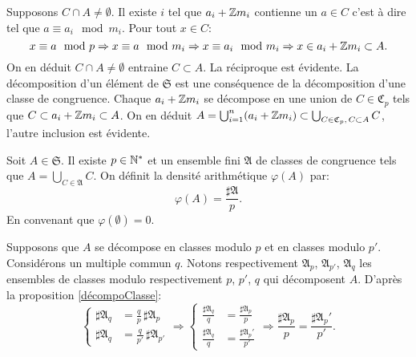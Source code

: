  \begin{demo}
  Supposons $C\cap A \neq \emptyset$. Il existe $i$ tel que $a_i + \mathbb{Z} m_i$ contienne un $a \in C$ c'est à dire tel que $a \equiv a_i \mod m_i$. Pour tout $x \in C$:
  \begin{displaymath}
   x \equiv a \mod p \Rightarrow x \equiv a \mod m_i \Rightarrow x \equiv a_i \mod m_i \Rightarrow x \in a_i + \mathbb{Z} m_i \subset A.
  \end{displaymath}
  On en déduit $C \cap A \neq \emptyset$ entraine $C \subset A$. La réciproque est évidente.\newline
  La décomposition d'un élément de $\mathfrak{S}$ est une conséquence de la décomposition d'une classe de congruence. Chaque $a_i + \mathbb{Z} m_i$ se décompose en une union de $C\in \mathfrak{C}_p$ tels que $C \subset a_i + \mathbb{Z} m_i \subset A$. On en déduit $A = \bigcup_{i=1}^n(a_i + \mathbb{Z} m_i) \subset \bigcup_{C \in \mathfrak{C}_p,\, C\subset A} C$, l'autre inclusion est évidente.
 \end{demo}

\begin{defi}
 Soit $A \in \mathfrak{S}$. Il existe $p \in \mathbb{N}^*$ et un ensemble fini $\mathfrak{A}$ de classes de congruence tels que $A = \bigcup_{C \in \mathfrak{A}}C$. On définit la densité arithmétique $\varphi(A)$ par:
 \begin{displaymath}
  \varphi(A) = \frac{\sharp \mathfrak{A}}{p}.
 \end{displaymath}
 En convenant que $\varphi(\emptyset) = 0$.
\end{defi}
\begin{demo}
Supposons que $A$ se décompose en classes modulo $p$ et en classes modulo $p'$. Considérons un multiple commun $q$. Notons respectivement $\mathfrak{A}_p$, $\mathfrak{A}_{p'}$, $\mathfrak{A}_q$ les ensembles de classes modulo respectivement $p$, $p'$, $q$ qui décomposent $A$. D'après la proposition \ref{décompoClasse}:
\begin{displaymath}
\left\lbrace
  \begin{aligned}
     \sharp \mathfrak{A}_q &= \frac{q}{p}  \, \sharp \mathfrak{A}_p \\
     \sharp \mathfrak{A}_q &= \frac{q}{p'} \, \sharp \mathfrak{A}_{p'}
  \end{aligned}
\right. \Rightarrow
\left\lbrace
 \begin{aligned}
    \frac{\sharp \mathfrak{A}_q}{q} &= \frac{\sharp \mathfrak{A}_p}{p} \\
    \frac{\sharp \mathfrak{A}_q}{q} &= \frac{\sharp \mathfrak{A}_p'}{p'}
 \end{aligned}
\right . \Rightarrow \frac{\sharp \mathfrak{A}_p}{p} = \frac{\sharp \mathfrak{A}_p'}{p'}.
\end{displaymath}
\end{demo}

